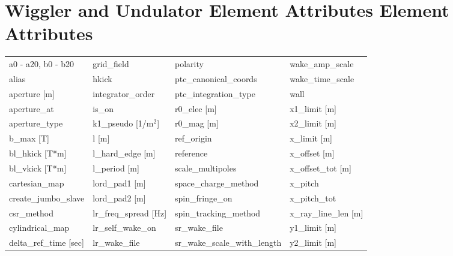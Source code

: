  \section{Wiggler and Undulator Element Attributes Element Attributes}
 \label{s:list.wiggler}
 
 \begin{tabular}{llll} \toprule
a0 - a20, b0 - b20             & grid_field                     & polarity                       & wake_amp_scale                 \\
alias                          & hkick                          & ptc_canonical_coords           & wake_time_scale                \\
aperture [m]                   & integrator_order               & ptc_integration_type           & wall                           \\
aperture_at                    & is_on                          & r0_elec [m]                    & x1_limit [m]                   \\
aperture_type                  & k1_pseudo [1/m$^2$]            & r0_mag [m]                     & x2_limit [m]                   \\
b_max [T]                      & l [m]                          & ref_origin                     & x_limit [m]                    \\
bl_hkick [T*m]                 & l_hard_edge [m]                & reference                      & x_offset [m]                   \\
bl_vkick [T*m]                 & l_period [m]                   & scale_multipoles               & x_offset_tot [m]               \\
cartesian_map                  & lord_pad1 [m]                  & space_charge_method            & x_pitch                        \\
create_jumbo_slave             & lord_pad2 [m]                  & spin_fringe_on                 & x_pitch_tot                    \\
csr_method                     & lr_freq_spread [Hz]            & spin_tracking_method           & x_ray_line_len [m]             \\
cylindrical_map                & lr_self_wake_on                & sr_wake_file                   & y1_limit [m]                   \\
delta_ref_time [sec]           & lr_wake_file                   & sr_wake_scale_with_length      & y2_limit [m]                   \\

\end{tabular}
